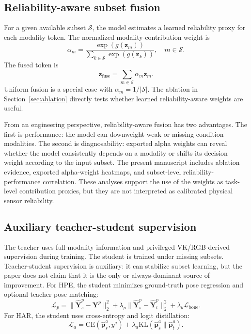 \documentclass[preprint,12pt]{elsarticle}
\begin{document}
\subsection{Reliability-aware subset fusion}

For a given available subset $\mathcal{S}$, the model estimates a learned reliability proxy for each modality token. The normalized modality-contribution weight is
\begin{equation}
    \alpha_m =
    \frac{\exp(g(\mathbf{z}_{m}))}
    {\sum_{k\in\mathcal{S}}\exp(g(\mathbf{z}_{k}))},
    \quad m\in\mathcal{S}.
\end{equation}
The fused token is
\begin{equation}
    \mathbf{z}_{\mathrm{fuse}} =
    \sum_{m\in\mathcal{S}}\alpha_m\mathbf{z}_{m}.
\end{equation}
Uniform fusion is a special case with $\alpha_m=1/|\mathcal{S}|$. The ablation in Section~\ref{sec:ablation} directly tests whether learned reliability-aware weights are useful.

From an engineering perspective, reliability-aware fusion has two advantages. The first is performance: the model can downweight weak or missing-condition modalities. The second is diagnosability: exported alpha weights can reveal whether the model consistently depends on a modality or shifts its decision weight according to the input subset. The present manuscript includes ablation evidence, exported alpha-weight heatmaps, and subset-level reliability-performance correlation. These analyses support the use of the weights as task-level contribution proxies, but they are not interpreted as calibrated physical sensor reliability.

\subsection{Auxiliary teacher-student supervision}

The teacher uses full-modality information and privileged VK/RGB-derived supervision during training. The student is trained under missing subsets. Teacher-student supervision is auxiliary: it can stabilize subset learning, but the paper does not claim that it is the only or always-dominant source of improvement. For HPE, the student minimizes ground-truth pose regression and optional teacher pose matching:
\begin{equation}
    \mathcal{L}_{p}=
    \|\hat{\mathbf{Y}}^{p}_{s}-\mathbf{Y}^{p}\|_2^2
    +\lambda_{p}\|\hat{\mathbf{Y}}^{p}_{s}-\hat{\mathbf{Y}}^{p}_{t}\|_2^2
    +\lambda_{b}\mathcal{L}_{\mathrm{bone}}.
\end{equation}
For HAR, the student uses cross-entropy and logit distillation:
\begin{equation}
    \mathcal{L}_{a} =
    \mathrm{CE}(\hat{\mathbf{p}}_{s}^{a},y^{a})
    +\lambda_{a}\mathrm{KL}
    (\hat{\mathbf{p}}_{s}^{a}\|\hat{\mathbf{p}}_{t}^{a}).
\end{equation}
\end{document}
